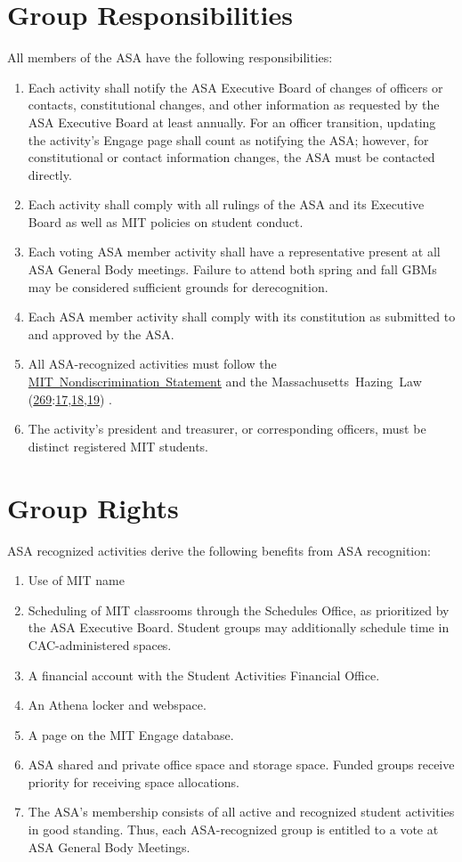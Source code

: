 \documentclass[12pt]{article}
\newcommand{\MHL}{%
    Massachusetts~Hazing~Law (\href{https://malegislature.gov/Laws/GeneralLaws/PartIV/TitleI/Chapter269}{269}:\href{https://malegislature.gov/Laws/GeneralLaws/PartIV/TitleI/Chapter269/Section17}{17},\href{https://malegislature.gov/Laws/GeneralLaws/PartIV/TitleI/Chapter269/Section18}{18},\href{https://malegislature.gov/Laws/GeneralLaws/PartIV/TitleI/Chapter269/Section19}{19})\xspace
}
\newcommand{\NDS}{\href{https://handbook.mit.edu/nondiscrimination}{MIT~Nondiscrimination~Statement}\xspace}
\begin{document}
\newpage

\label{art:rights_and_resps}


\section{Group Responsibilities}
All members of the ASA have the following responsibilities:
\begin{enumerate}
    \item Each activity shall notify the ASA Executive Board of changes of officers or contacts,
constitutional changes, and other information as requested by the ASA Executive Board at
least annually. For an officer transition, updating the activity’s Engage page shall count as
notifying the ASA; however, for constitutional or contact information changes, the ASA must
be contacted directly.
    \item Each activity shall comply with all rulings of the ASA and its Executive Board as well as MIT
policies on student conduct.
    \item Each voting ASA member activity shall have a representative present at all ASA General Body
meetings. Failure to attend both spring and fall GBMs may be considered sufficient grounds
for derecognition.
    \item Each ASA member activity shall comply with its constitution as submitted to and approved
by the ASA.
    \item All ASA-recognized activities must follow the \NDS and the \MHL.
    \item The activity’s president and treasurer, or corresponding officers, must be distinct registered
MIT students.
\end{enumerate}

\section{Group Rights}
ASA recognized activities derive the following benefits from ASA recognition:
\begin{enumerate}
    \item Use of MIT name
    \item Scheduling of MIT classrooms through the Schedules Office, as prioritized by the ASA
Executive Board. Student groups may additionally schedule time in CAC-administered
spaces.
    \item A financial account with the Student Activities Financial Office.
    \item An Athena locker and webspace.
    \item A page on the MIT Engage database.
    \item ASA shared and private office space and storage space. Funded groups receive priority
for receiving space allocations.
    \item The ASA’s membership consists of all active and recognized student activities in good
standing. Thus, each ASA-recognized group is entitled to a vote at ASA General Body
Meetings.
\end{enumerate}
\end{document}
